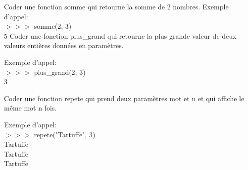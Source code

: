 \begin{Exercise}[title={Ça va fonctionner!}]
\Question Coder une fonction somme qui retourne la somme de 2 nombres.
Exemple d'appel:\\
$>>>$ somme(2, 3)\\
5
\Question Coder une fonction plus\_grand qui retourne la plus grande valeur de deux valeurs entières données en paramètres.

Exemple d'appel:\\
$>>>$ plus\_grand(2, 3)\\
3

\Question Coder une fonction repete qui prend deux paramètres mot et n et qui affiche le même mot n fois.

Exemple d'appel:\\
$>>>$ repete("Tartuffe", 3)\\
Tartuffe\\
Tartuffe\\
Tartuffe

\end{Exercise}


